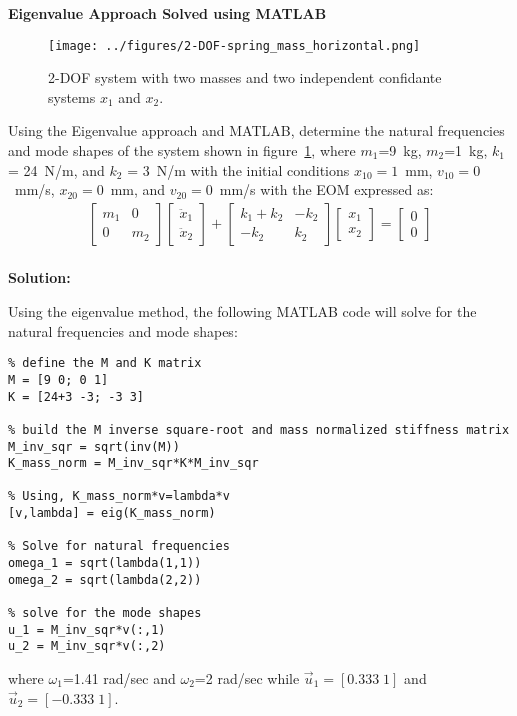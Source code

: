 \documentclass[12pt,letter]{article}
\begin{document}
	
	
		\begin{example}
		\textbf{Eigenvalue Approach Solved using MATLAB}
		
		\begin{figure}[H]
			\centering
			\texttt{[image: ../figures/2-DOF-spring\_mass\_horizontal.png]}
			\caption{2-DOF system with two masses and two independent confidante systems $x_1$ and $x_2$.}
			\label{fig:2-DOF-spring_mass_horizontal_2}
		\end{figure}
		
		\noindent Using the Eigenvalue approach and MATLAB, determine the natural frequencies and mode shapes of the system shown in figure~\ref{fig:2-DOF-spring_mass_horizontal_2}, where $m_1$=9~kg, $m_2$=1~kg, $k_1$ = 24~N/m, and $k_2$ = 3~N/m with the initial conditions $x_{10}=1$~mm, $v_{10}=0$~mm/s, $x_{20}=0$~mm, and $v_{20}=0$~mm/s with the EOM expressed as: 
		\begin{eqnarray}
		  \begin{bmatrix} m_1 & 0  \\  0 & m_2 \end{bmatrix}\begin{bmatrix} \ddot{x}_1 \\  \ddot{x}_2 \end{bmatrix} + \begin{bmatrix} k_1+k_2 & -k_2  \\  -k_2 & k_2 \end{bmatrix}\begin{bmatrix} x_1 \\  x_2 \end{bmatrix} = \begin{bmatrix} 0 \\  0 \end{bmatrix}
		\end{eqnarray} \\
	
		\noindent \textbf{Solution:} 
	
	\noindent Using the eigenvalue method, the following MATLAB code will solve for the natural frequencies and mode shapes:
		
		\begin{lstlisting}
% define the M and K matrix
M = [9 0; 0 1]
K = [24+3 -3; -3 3]

% build the M inverse square-root and mass normalized stiffness matrix 
M_inv_sqr = sqrt(inv(M))
K_mass_norm = M_inv_sqr*K*M_inv_sqr

% Using, K_mass_norm*v=lambda*v
[v,lambda] = eig(K_mass_norm)

% Solve for natural frequencies
omega_1 = sqrt(lambda(1,1))
omega_2 = sqrt(lambda(2,2))

% solve for the mode shapes
u_1 = M_inv_sqr*v(:,1)
u_2 = M_inv_sqr*v(:,2)
				\end{lstlisting}
		\noindent where $\omega_1$=1.41 rad/sec and  $\omega_2$=2 rad/sec while $\vec{u}_1 = [0.333 \; 1]$ and $\vec{u}_2 = [-0.333 \; 1]$.
		\end{example}
	
\end{document}
